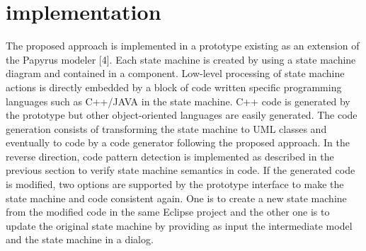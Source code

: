 \section{implementation}
\label{sec:implementation}
The proposed approach is implemented in a prototype existing as an extension of the Papyrus modeler [4]. Each state machine is created by using a state machine diagram and contained in a component. Low-level processing of state machine actions is directly embedded by a block of code written specific programming languages such as C++/JAVA in the state machine. C++ code is generated by the prototype but other object-oriented languages are easily generated. The code generation consists of transforming the state machine to UML classes and eventually to code by a code generator following the proposed approach. In the reverse direction, code pattern detection is implemented as described in the previous section to verify state machine semantics in code. If the generated code is modified, two options are supported by the prototype interface to make the state machine and code consistent again. One is to create a new state machine from the modified code in the same Eclipse project and the other one is to update the original state machine by providing as input the intermediate model and the state machine in a dialog.